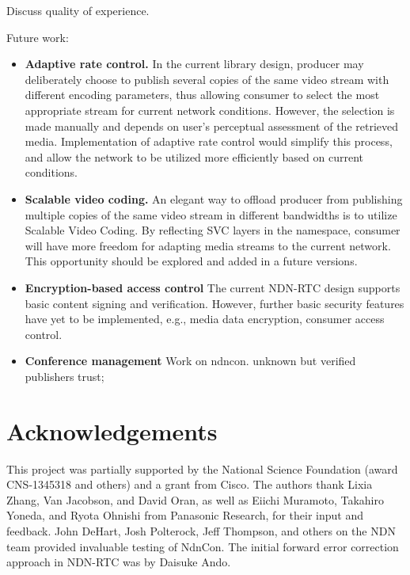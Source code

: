\documentclass{icn/sig-alternate-2012} %
\newcommand{\ndnrtcName}{NDN-RTC} %
\newcommand{\ndnconName}{NdnCon}
\begin{document}

Discuss quality of experience. 

Future work: 
\begin{itemize}[label={}]
\item \textbf{Adaptive rate control.} In the current library design, producer may deliberately choose to publish several copies of the same video stream with different encoding parameters, thus allowing consumer to select the most appropriate stream for current network conditions. However, the selection is made manually and depends on user's perceptual assessment of the retrieved media. Implementation of adaptive rate control would simplify this process, and allow the network to be utilized more efficiently based on current conditions.

\item \textbf{Scalable video coding.} An elegant way to offload producer from publishing multiple copies of the same video stream in different bandwidths is to utilize Scalable Video Coding. By reflecting SVC layers in the namespace, consumer will have more freedom for adapting media streams to the current network. This opportunity should be explored and added in a future versions.

\item \textbf{Encryption-based access control} The current \ndnrtcName{} design supports basic content signing and verification. However, further basic security features have yet to be implemented, e.g., media data encryption, consumer access control.

\item \textbf{Conference management} 
Work on ndncon. unknown but verified publishers trust; 
\end{itemize}


\section{Acknowledgements}
\label{sec:Acknowledgements}
This project was partially supported by the National Science Foundation (award CNS-1345318 and others) and a grant from Cisco. The authors thank Lixia Zhang, Van Jacobson, and David Oran, as well as Eiichi Muramoto, Takahiro Yoneda, and Ryota Ohnishi from Panasonic Research, for their input and feedback. John DeHart, Josh Polterock, Jeff Thompson, and others on the NDN team provided invaluable testing of \ndnconName{}.  The initial forward error correction approach in \ndnrtcName{} was by Daisuke Ando. 



\end{document}
